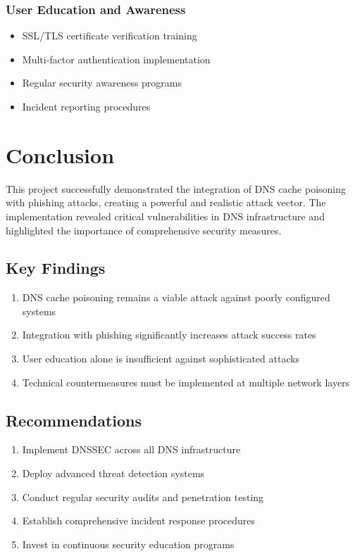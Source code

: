 \documentclass[12pt,a4paper]{article}
\begin{document}
\subsubsection{User Education and Awareness}

\begin{itemize}
    \item SSL/TLS certificate verification training
    \item Multi-factor authentication implementation
    \item Regular security awareness programs
    \item Incident reporting procedures
\end{itemize}

\section{Conclusion}

This project successfully demonstrated the integration of DNS cache poisoning with phishing attacks, creating a powerful and realistic attack vector. The implementation revealed critical vulnerabilities in DNS infrastructure and highlighted the importance of comprehensive security measures.

\subsection{Key Findings}

\begin{enumerate}
    \item DNS cache poisoning remains a viable attack against poorly configured systems
    \item Integration with phishing significantly increases attack success rates
    \item User education alone is insufficient against sophisticated attacks
    \item Technical countermeasures must be implemented at multiple network layers
\end{enumerate}

\subsection{Recommendations}

\begin{enumerate}
    \item Implement DNSSEC across all DNS infrastructure
    \item Deploy advanced threat detection systems
    \item Conduct regular security audits and penetration testing
    \item Establish comprehensive incident response procedures
    \item Invest in continuous security education programs
\end{enumerate}
\end{document}
